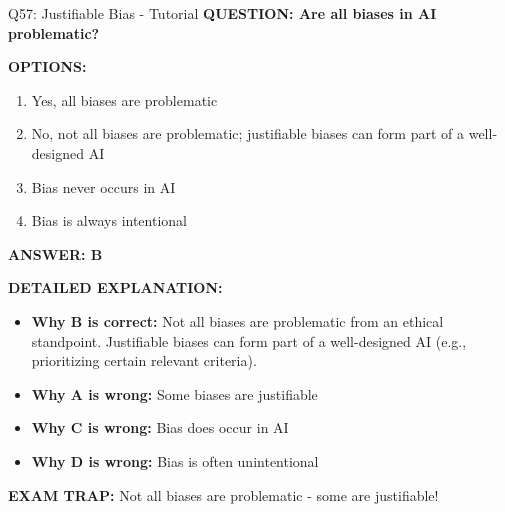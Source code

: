 \documentclass[8pt]{beamer}
\begin{document}
	\begin{frame}{Q57: Justifiable Bias - Tutorial}
		\fontsize{6.5}{7.5}\selectfont
		\textbf{QUESTION: Are all biases in AI problematic?}
		
		\vspace{0.1cm}
		\textbf{OPTIONS:}
		\begin{enumerate}
			\item Yes, all biases are problematic
			\item No, not all biases are problematic; justifiable biases can form part of a well-designed AI
			\item Bias never occurs in AI
			\item Bias is always intentional
		\end{enumerate}
		
		\vspace{0.1cm}
		\textcolor{myblue}{\textbf{ANSWER: B}}
		
		\vspace{0.1cm}
		\textbf{DETAILED EXPLANATION:}
		\begin{itemize}
			\item \textbf{Why B is correct:} Not all biases are problematic from an ethical standpoint. Justifiable biases can form part of a well-designed AI (e.g., prioritizing certain relevant criteria).
			\item \textbf{Why A is wrong:} Some biases are justifiable
			\item \textbf{Why C is wrong:} Bias does occur in AI
			\item \textbf{Why D is wrong:} Bias is often unintentional
		\end{itemize}
		
		\textcolor{myred}{\textbf{EXAM TRAP:}} Not all biases are \textcolor{myblue}{problematic} - some are justifiable!
	\end{frame}
	
\end{document}
